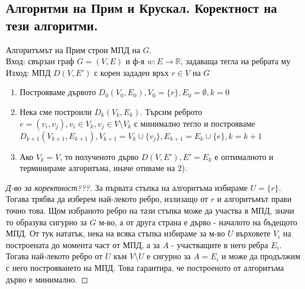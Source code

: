 \subsection*{Алгоритми на Прим и Крускал. Коректност на тези алгоритми.}

\begin{alg}[на Прим]
    Алгоритъмът на Прим строи МПД на \(G\). \\
    Вход: свързан граф \(G = (V, E)\) и ф-я \(w: E \to \mathbb{R}\), задаваща тегла на 
    ребрата му \\
    Изход: МПД \(D(V, E')\) с корен зададен връх \(r \in V\) на \(G\)
    \begin{enumerate}
        \item Построяваме дървото \(D_0(V_0, E_0), V_0 = \{r\}, E_0 = \emptyset, k = 0\)
        \item Нека сме построили \(D_k(V_k, E_k)\). Търсим реброто \(e = (v_i, v_j), v_i \in V_k, 
        v_j \in V \setminus V_k\) с минимално тегло и построяваме \(D_{k + 1} (V_{k + 1}, E_{k + 1}), 
        V_{k + 1} = V_k \cup \{v_j\}, E_{k + 1} = E_k \cup \{e\}, k = k + 1\)
        \item Ако \(V_k = V\), то полученото дърво \(D(V, E'), E' = E_k\) е оптималното и терминираме 
        алгоритъма, иначе отиваме на 2).
    \end{enumerate}
\end{alg}

\begin{proof}[Д-во за коректност???]
    За първата стъпка на алгоритъма избираме \(U = \{r\}\). Тогава трябва да изберем най-лекото ребро, 
    излизащо от \(r\) и алгоритъмът прави точно това. Щом избраното ребро на тази стъпка може да участва 
    в МПД, значи то образува сигурно за \(G\) м-во, а от друга страна е дърво - началото на 
    бъдещото МПД. От тук нататък, нека на всяка стъпка избираме за м-во \(U\) върховете \(V_i\) на 
    построената до момента част от МПД, а за \(A\) - участващите в него ребра \(E_i\). Тогава 
    най-лекото ребро от \(U\) към \(V \setminus U\) е сигурно за \(A = E_i\) и може да продължим с него 
    построяването на МПД. Това гарантира, че построеното от алгоритъма дърво е минимално.
\end{proof}

